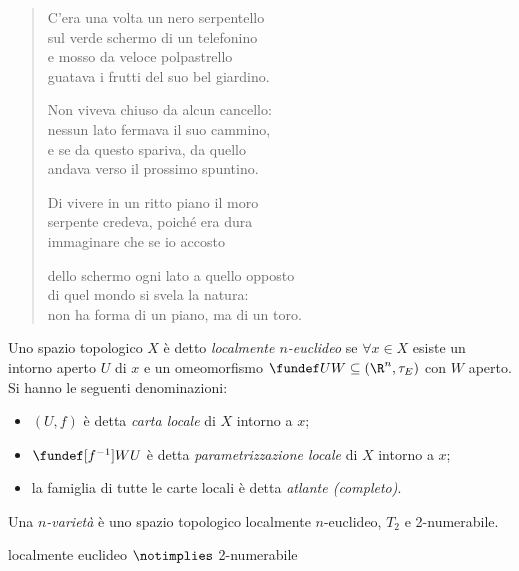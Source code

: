 
\begin{verse}
C'era una volta un nero serpentello\\
sul verde schermo di un telefonino\\
e mosso da veloce polpastrello\\
guatava i frutti del suo bel giardino.

Non viveva chiuso da alcun cancello:\\
nessun lato fermava il suo cammino,\\
e se da questo spariva, da quello\\
andava verso il prossimo spuntino.

Di vivere in un ritto piano il moro\\
serpente credeva, poiché era dura\\
immaginare che se io accosto

dello schermo ogni lato a quello opposto\\
di quel mondo si svela la natura:\\
non ha forma di un piano, ma di un toro.
\end{verse}


\begin{defn}
	Uno spazio topologico $X$ è detto \emph{localmente $n$-euclideo} se
	$\forall x \in X$ esiste un intorno aperto $U$ di $x$
	e un omeomorfismo $\fundef UW \subseteq (\R^n, \tau _E)$ con $W$ aperto.
	Si hanno le seguenti denominazioni:
	\begin{itemize}
		\item $(U,f)$ è detta \emph{carta locale} di $X$ intorno a $x$;
		\item $\fundef [f^{-1}] WU$ è detta \emph{parametrizzazione locale} di $X$ intorno a $x$;
		\item la famiglia di tutte le carte locali è detta \emph{atlante (completo)}.
	\end{itemize}
\end{defn}

\begin{defn}[Varietà]
	Una \emph{$n$-varietà} è uno spazio topologico localmente $n$-euclideo, $T_2$ e 2-numerabile.
\end{defn}

\begin{prop}
	localmente euclideo $\notimplies$ 2-numerabile
\end{prop}

